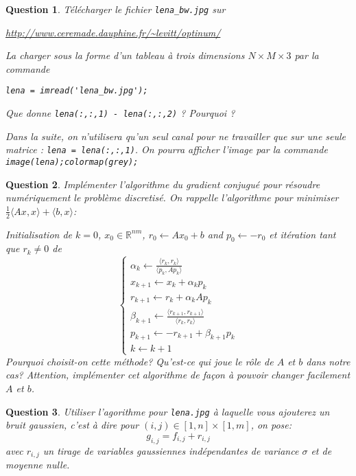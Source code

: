 \documentclass[10pt,a4paper,fleqn]{report}
\newcommand{\dotp}[2]{\langle #1 , #2\rangle}
\newcommand{\R}{\mathbb R}
\newtheorem{question}{Question}
\begin{document}
\begin{question}
  Télécharger le fichier \verb+lena_bw.jpg+ sur

  \url{http://www.ceremade.dauphine.fr/~levitt/optinum/}

  La charger sous la forme d'un tableau à trois dimensions $N \times M
  \times 3$ par la commande

  \verb+lena = imread('lena_bw.jpg');+

  Que donne \verb+lena(:,:,1) - lena(:,:,2)+ ? Pourquoi ?

  Dans la suite, on n'utilisera qu'un seul canal pour ne travailler
  que sur une seule matrice : \verb+lena = lena(:,:,1)+. On pourra
  afficher l'image par la commande \verb+image(lena);colormap(grey);+
\end{question}

\begin{question}
Impl\'ementer l'algorithme du gradient conjugu\'e pour r\'esoudre num\'eriquement le probl\`eme discretis\'e. On rappelle l'algorithme pour minimiser $\frac12 \dotp{Ax}{x}+\dotp{b}{x}$:

Initialisation de $k=0$,
$x_0 \in \R^{nm}$,  $r_0 \leftarrow Ax_0 + b$ and $p_0 \leftarrow -r_0$ et it\'eration tant que $r_k\neq 0$ de
\begin{equation}
\begin{cases}
    \alpha_k \leftarrow \frac{\dotp{r_k}{r_k} }{ \dotp{p_k}{A p_k} } \\
    x_{k+1} \leftarrow x_k + \alpha_k p_k         \\
    r_{k+1} \leftarrow r_k + \alpha_k A p_k       \\
    \beta_{k+1} \leftarrow \frac{ \dotp{r_{k+1}}{r_{k+1}} }{ \dotp{r_k}{r_k} }   \\
    p_{k+1} \leftarrow -r_{k+1} + \beta_{k+1} p_k\\
    k \leftarrow k+1
\end{cases}
\end{equation}
Pourquoi choisit-on cette m\'ethode? Qu'est-ce qui joue le r\^ole de $A$ et $b$ dans notre cas?
Attention, impl\'ementer cet algorithme de fa\c{c}on \`a pouvoir changer facilement $A$ et $b$.
\end{question}

\begin{question}
Utiliser l'agorithme pour \texttt{lena.jpg} \`a laquelle vous ajouterez un bruit gaussien, c'est \`a dire pour $ (i,j)\in [1,n]\times[1,m]$, on pose:
\begin{equation}
g_{i,j} = f_{i,j} + r_{i,j}
\end{equation}
avec $r_{i,j}$ un tirage de variables gaussiennes ind\'ependantes de variance $\sigma$ et de moyenne nulle.
\end{question}
\end{document}
